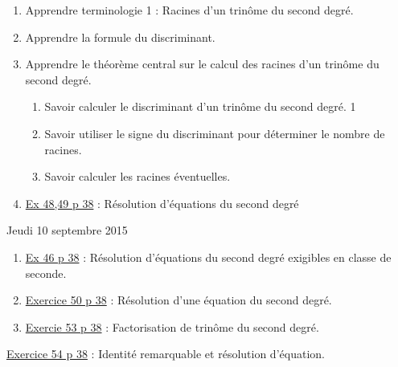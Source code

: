 \documentclass[a4paper,11pt]{article}
\theoremstyle{break}
\begin{document}
  \begin{Dev}
    
    \begin{enumerate}
      
      \item Apprendre terminologie 1 : Racines d'un trinôme du second degré.
      \item Apprendre la formule du discriminant.
      \item Apprendre le théorème central sur le calcul des racines 
	d'un trinôme du second degré.
      \begin{enumerate}
	\item Savoir calculer le discriminant d'un trinôme du second degré. 1
	\item Savoir utiliser le signe du discriminant pour déterminer
	le nombre de racines.
	\item Savoir calculer les racines éventuelles.
      \end{enumerate}
      \item  
    \href{https://github.com/mathlorgues/math1sd1516/blob/master/images/47-52p38.png}
   {Ex 48,49 p 38} : 
    Résolution d'équations du second degré
    
      
    \end{enumerate}
  \end{Dev}
 \newpage
    Jeudi 10 septembre 2015
   \begin{enumerate}   
     \item  
    \href{https://github.com/mathlorgues/math1sd1516/blob/master/images/46p38.jpg}
   {Ex 46 p 38} : Résolution d'équations du second degré exigibles en classe de seconde.
    
    \item 
    \href{https://github.com/mathlorgues/math1sd1516/blob/master/20150907/46p38.jpg}
   {Exercice 50 p 38} : Résolution d'une équation du second degré.
    \item 
    \href{https://github.com/mathlorgues/math1sd1516/blob/master/images/53-54p38.png}
    {Exercie 53 p 38} : Factorisation de trinôme du second degré.
    
    
    
  \end{enumerate}
  
  \begin{Dev}  
    \href{https://github.com/mathlorgues/math1sd1516/blob/master/images/53-54p38.png}
    {Exercice 54 p 38} : Identité remarquable et résolution d'équation.
  \end{Dev}
  
\end{document}
